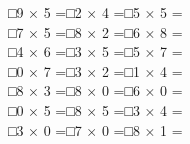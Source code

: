 \documentclass[uplatex,
paper=a4,
fontsize=18pt,
jafontsize=16pt,
number_of_lines=30,
line_length=30zh,
baselineskip=25pt,
]{jlreq}
\begin{document}
□\hspace{1em}9 × 5 =\hspace{3em}□\hspace{1em}2 × 4 =\hspace{3em}□\hspace{1em}5 × 5 =\hspace{3em}
\\

□\hspace{1em}7 × 5 =\hspace{3em}□\hspace{1em}8 × 2 =\hspace{3em}□\hspace{1em}6 × 8 =\hspace{3em}
\\

□\hspace{1em}4 × 6 =\hspace{3em}□\hspace{1em}3 × 5 =\hspace{3em}□\hspace{1em}5 × 7 =\hspace{3em}
\\

□\hspace{1em}0 × 7 =\hspace{3em}□\hspace{1em}3 × 2 =\hspace{3em}□\hspace{1em}1 × 4 =\hspace{3em}
\\

□\hspace{1em}8 × 3 =\hspace{3em}□\hspace{1em}8 × 0 =\hspace{3em}□\hspace{1em}6 × 0 =\hspace{3em}
\\

□\hspace{1em}0 × 5 =\hspace{3em}□\hspace{1em}8 × 5 =\hspace{3em}□\hspace{1em}3 × 4 =\hspace{3em}
\\

□\hspace{1em}3 × 0 =\hspace{3em}□\hspace{1em}7 × 0 =\hspace{3em}□\hspace{1em}8 × 1 =\hspace{3em}
\\
\end{document}
